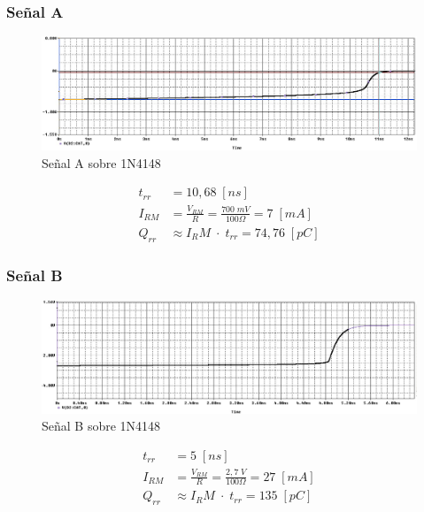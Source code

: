 \documentclass{article}
\begin{document}
\subsubsection{Señal A}
\begin{figure}[h!]
 \begin{center}
	\includegraphics[width=\textwidth]{imagenes/1N4148_A.jpg} 
	\caption{Señal A sobre 1N4148}
 \end{center}
\end{figure}
\begin{align*}
	t_{rr} &= 10,68 \; [ns] \\
	I_{RM}	&= \frac{V_{RM}}{R} = \frac{700 \; mV}{100 \Omega} = 7 \; [mA] \\
	Q_{rr}	&\approx {I_RM} \; \cdot \; t_{rr} = 74,76 \; [pC]
\end{align*}
%
\subsubsection{Señal B}
\begin{figure}[h!]
 \begin{center}
	\includegraphics[width=\textwidth]{imagenes/1N4148_B.jpg} 
	\caption{Señal B sobre 1N4148}
 \end{center}
\end{figure}
\begin{align*}
	t_{rr} &= 5 \; [ns] \\
	I_{RM}	&= \frac{V_{RM}}{R} = \frac{2,7 \; V}{100 \Omega} = 27 \; [mA] \\
	Q_{rr}	&\approx {I_RM} \; \cdot \; t_{rr} = 135 \; [pC]
\end{align*}
%
\end{document}
